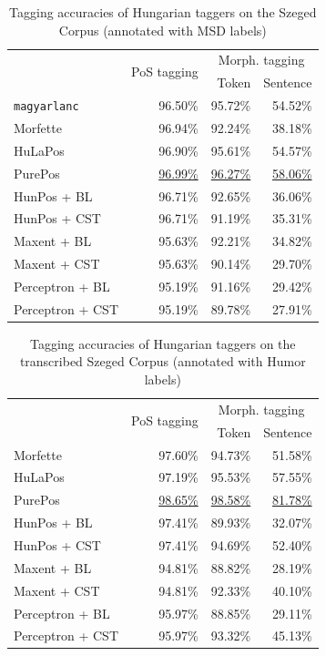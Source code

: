 \begin{table}[H]
 \centering
 \caption{Tagging accuracies of Hungarian taggers on the Szeged Corpus (annotated with MSD labels)}
\begin{tabular}{l r r r}
  \hline
   & \multirow{2}{*}{PoS tagging} & \multicolumn{2}{c}{Morph. tagging} \\
   & &  Token &  Sentence \\
  \hline
  \texttt{magyarlanc} &  96.50\% &  95.72\% &  54.52\% \\
  Morfette &  96.94\% &  92.24\% &  38.18\% \\
  HuLaPos &  96.90\% &   95.61\% & 54.57\% \\
  PurePos &  \underline{96.99\%} &  \underline{96.27\%} &  \underline{58.06\%} \\
  HunPos + BL &  96.71\% &  92.65\% &  36.06\% \\
  HunPos + CST &  96.71\% &  91.19\% &  35.31\% \\
  Maxent + BL &  95.63\% &  92.21\% &  34.82\% \\
  Maxent + CST &  95.63\% &  90.14\% &  29.70\% \\
  Perceptron + BL &  95.19\% &  91.16\% &  29.42\% \\
  Perceptron + CST &  95.19\% &  89.78\% &  27.91\% \\
  \hline
\end{tabular}
\label{tab:morphtag-orig}
\end{table}


\begin{table}[H]
 \centering
 \caption{Tagging accuracies of Hungarian taggers on the transcribed Szeged Corpus (annotated with Humor labels)}
\begin{tabular}{l r r r}
  \hline
   & \multirow{2}{*}{PoS tagging} & \multicolumn{2}{c}{Morph. tagging} \\
   & &  Token &  Sentence \\
  \hline
  Morfette &  97.60\% &  94.73\% &  51.58\% \\
  HuLaPos &  97.19\% &  95.53\% &   57.55\% \\
  PurePos &  \underline{98.65\%} &  \underline{98.58\%} &  \underline{81.78\%} \\
  HunPos + BL &  97.41\% &  89.93\% &  32.07\% \\
  HunPos + CST &  97.41\% &  94.69\% &  52.40\% \\
  Maxent + BL &  94.81\% &  88.82\% &  28.19\% \\
  Maxent + CST &  94.81\% &  92.33\% &  40.10\% \\
  Perceptron + BL &  95.97\% &  88.85\% &  29.11\% \\
  Perceptron + CST &  95.97\% &  93.32\% &  45.13\% \\
  \hline
\end{tabular}
\label{tab:morphtag-humor}
\end{table}

